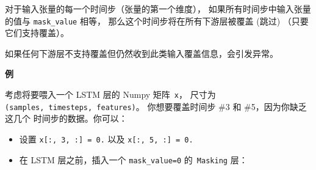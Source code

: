 对于输入张量的每一个时间步（张量的第一个维度），
如果所有时间步中输入张量的值与 \texttt{mask\_value} 相等，
那么这个时间步将在所有下游层被覆盖 (跳过) （只要它们支持覆盖）。

如果任何下游层不支持覆盖但仍然收到此类输入覆盖信息，会引发异常。

\textbf{例}

考虑将要喂入一个 LSTM 层的 Numpy 矩阵~\texttt{x}， 尺寸为
\texttt{(samples,\ timesteps,\ features)}。 你想要覆盖时间步 \#3 和
\#5，因为你缺乏这几个 时间步的数据。你可以：

\begin{itemize}
\tightlist
\item
  设置 \texttt{x{[}:,\ 3,\ :{]}\ =\ 0.} 以及
  \texttt{x{[}:,\ 5,\ :{]}\ =\ 0.}
\item
  在 LSTM 层之前，插入一个 \texttt{mask\_value=0} 的~\texttt{Masking}
  层：
\end{itemize}

\begin{Shaded}
\begin{Highlighting}[]
\OperatorTok{=} 
\OperatorTok{=}\OperatorTok{=}
\NormalTok{))}
\end{Highlighting}
\end{Shaded}
\newpage